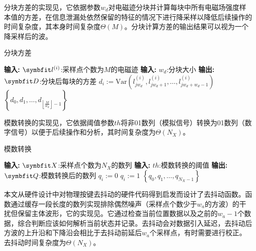 {{	分块方差的实现见，它依据参数$w_d$对电磁迹分块并计算每块中所有电磁场强度样本值的方差，在信息泄漏处依然保留的特征的情况下进行降采样以降低后续操作的时间复杂度，其本身时间复杂度$\Theta(M)$。分块计算方差的输出结果可以视为一个降采样后的波。
	
	\begin{breakablealgorithm}
		\caption{分块方差}\label{alg:calcvar}
		\begin{algorithmic}[1]
			\Statex \textbf{输入:} $\Vector{l}^{(i)}$:采样点个数为$M$的电磁迹
			\Statex \textbf{输入:} $w_d$:分块大小
			\Statex \textbf{输出:} $\Vector D$:分块后每块的方差
			\State $d_i:=\mathrm{Var}(l^{(i)}_{jw_d},l^{(i)}_{jw_d+1},\dots,l^{(i)}_{jw_d+w_d-1})$
			\EndFor
			\State \Return $\left\{d_0,d_1,\dots,d_{\left\lfloor\frac{M}{w_d}\right\rfloor-1}\right\}$
		\end{algorithmic}
	\end{breakablealgorithm}
	
	模数转换的实现见，它依据阈值参数$th$将非01数列（模拟信号）转换为01数列（数字信号）以便于后续操作和分析，其时间复杂度为$\Theta(N_X)$。
	
	\begin{breakablealgorithm}
		\caption{模数转换}\label{alg:quantize}
		\begin{algorithmic}[1]
			\Statex \textbf{输入:} $\Vector X$:采样点个数为$N_X$的数列
			\Statex \textbf{输入:} $th$:模数转换的阈值
			\Statex \textbf{输出:} $\Vector Q$:模数转换后的数列
			\For {$i:=0,\dots, N_X-1$}
			\If{$x_i<th$}
			\State $q_i:=0$
			\Else
			\State $q_i:=1$
			\EndIf
			\EndFor
			\State \Return $\left\{q_0,q_1,\dots,q_{N_X-1}\right\}$
		\end{algorithmic}
	\end{breakablealgorithm}
	
	本文从硬件设计中对物理按键去抖动的硬件代码得到启发而设计了去抖动函数。函数通过缓存一段长度的数列实现排除偶然噪声（采样点个数少于$w_a$的方波）的干扰但保留主体波形，它的实现见。它通过检查当前位置数据以及之前的$w_a-1$个数据，综合判断应该如何解析当前状态并记录。去抖动会对数据引入延迟，去抖动后方波的上升沿和下降沿会相比于去抖动前延后$w_a$个采样点，有时需要进行校正。去抖动时间复杂度为$\Theta(N_X)$。
	
}}
